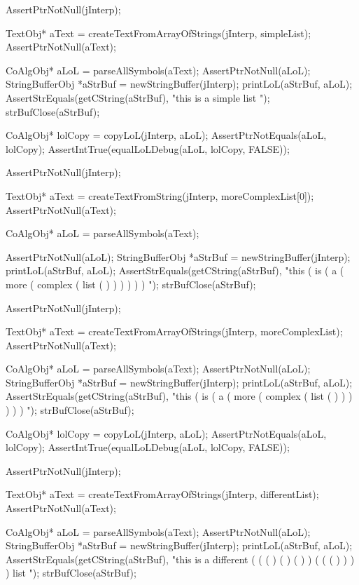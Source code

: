 \startCTest
  AssertPtrNotNull(jInterp);

  TextObj* aText =
    createTextFromArrayOfStrings(jInterp, simpleList);
  AssertPtrNotNull(aText);

  CoAlgObj* aLoL = parseAllSymbols(aText);
  AssertPtrNotNull(aLoL);
  StringBufferObj *aStrBuf = newStringBuffer(jInterp);
  printLoL(aStrBuf, aLoL);
  AssertStrEquals(getCString(aStrBuf), "this is a simple list ");
  strBufClose(aStrBuf);

  CoAlgObj* lolCopy = copyLoL(jInterp, aLoL);
  AssertPtrNotEquals(aLoL, lolCopy);
  AssertIntTrue(equalLoLDebug(aLoL, lolCopy, FALSE));
\stopCTest
\stopTestCase

\startCTest
  AssertPtrNotNull(jInterp);

  TextObj* aText =
    createTextFromString(jInterp, moreComplexList[0]);
  AssertPtrNotNull(aText);

  CoAlgObj* aLoL = parseAllSymbols(aText);

  AssertPtrNotNull(aLoL);
  StringBufferObj *aStrBuf = newStringBuffer(jInterp);
  printLoL(aStrBuf, aLoL);
  AssertStrEquals(getCString(aStrBuf),
    "this ( is ( a ( more ( complex ( list ( ) ) ) ) ) ) ");
  strBufClose(aStrBuf);
\stopCTest
\stopTestCase

\startCTest
  AssertPtrNotNull(jInterp);

  TextObj* aText =
    createTextFromArrayOfStrings(jInterp, moreComplexList);
  AssertPtrNotNull(aText);

  CoAlgObj* aLoL = parseAllSymbols(aText);
  AssertPtrNotNull(aLoL);
  StringBufferObj *aStrBuf = newStringBuffer(jInterp);
  printLoL(aStrBuf, aLoL);
  AssertStrEquals(getCString(aStrBuf),
    "this ( is ( a ( more ( complex ( list ( ) ) ) ) ) ) ");
  strBufClose(aStrBuf);
  
  CoAlgObj* lolCopy = copyLoL(jInterp, aLoL);
  AssertPtrNotEquals(aLoL, lolCopy);
  AssertIntTrue(equalLoLDebug(aLoL, lolCopy, FALSE));
\stopCTest
\stopTestCase

\startCTest
  AssertPtrNotNull(jInterp);

  TextObj* aText =
    createTextFromArrayOfStrings(jInterp, differentList);
  AssertPtrNotNull(aText);

  CoAlgObj* aLoL = parseAllSymbols(aText);
  AssertPtrNotNull(aLoL);
  StringBufferObj *aStrBuf = newStringBuffer(jInterp);
  printLoL(aStrBuf, aLoL);
  AssertStrEquals(getCString(aStrBuf),
    "this is a different ( ( ( ) ( ) ( ) ) ( ( ( ) ) ) ) list ");
  strBufClose(aStrBuf);
\stopCTest
\stopTestCase

